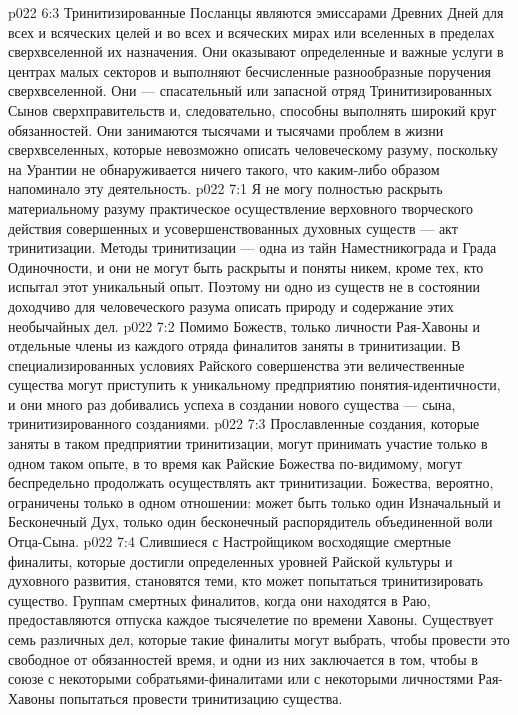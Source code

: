 \vs p022 6:3 Тринитизированные Посланцы являются эмиссарами Древних Дней для всех и всяческих целей и во всех и всяческих мирах или вселенных в пределах сверхвселенной их назначения. Они оказывают определенные и важные услуги в центрах малых секторов и выполняют бесчисленные разнообразные поручения сверхвселенной. Они --- спасательный или запасной отряд Тринитизированных Сынов сверхправительств и, следовательно, способны выполнять широкий круг обязанностей. Они занимаются тысячами и тысячами проблем в жизни сверхвселенных, которые невозможно описать человеческому разуму, поскольку на Урантии не обнаруживается ничего такого, что каким\hyp{}либо образом напоминало эту деятельность.
\vs p022 7:1 Я не могу полностью раскрыть материальному разуму практическое осуществление верховного творческого действия совершенных и усовершенствованных духовных существ --- акт тринитизации. Методы тринитизации --- одна из тайн Наместникограда и Града Одиночности, и они не могут быть раскрыты и поняты никем, кроме тех, кто испытал этот уникальный опыт. Поэтому ни одно из существ не в состоянии доходчиво для человеческого разума описать природу и содержание этих необычайных дел.
\vs p022 7:2 Помимо Божеств, только личности Рая\hyp{}Хавоны и отдельные члены из каждого отряда финалитов заняты в тринитизации. В специализированных условиях Райского совершенства эти величественные существа могут приступить к уникальному предприятию понятия\hyp{}идентичности, и они много раз добивались успеха в создании нового существа --- сына, тринитизированного созданиями.
\vs p022 7:3 Прославленные создания, которые заняты в таком предприятии тринитизации, могут принимать участие только в одном таком опыте, в то время как Райские Божества по\hyp{}видимому, могут беспредельно продолжать осуществлять акт тринитизации. Божества, вероятно, ограничены только в одном отношении: может быть только один Изначальный и Бесконечный Дух, только один бесконечный распорядитель объединенной воли Отца\hyp{}Сына.
\vs p022 7:4 Слившиеся с Настройщиком восходящие смертные финалиты, которые достигли определенных уровней Райской культуры и духовного развития, становятся теми, кто может попытаться тринитизировать существо. Группам смертных финалитов, когда они находятся в Раю, предоставляются отпуска каждое тысячелетие по времени Хавоны. Существует семь различных дел, которые такие финалиты могут выбрать, чтобы провести это свободное от обязанностей время, и одни из них заключается в том, чтобы в союзе с некоторыми собратьями\hyp{}финалитами или с некоторыми личностями Рая\hyp{}Хавоны попытаться провести тринитизацию существа.
